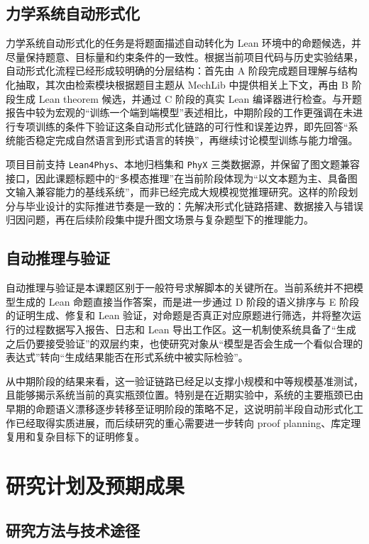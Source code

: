 \documentclass[12pt,a4paper]{ctexart}
\begin{document}
\subsection{力学系统自动形式化}

力学系统自动形式化的任务是将题面描述自动转化为 Lean 环境中的命题候选，并尽量保持题意、目标量和约束条件的一致性。根据当前项目代码与历史实验结果，自动形式化流程已经形成较明确的分层结构：首先由 A 阶段完成题目理解与结构化抽取，其次由检索模块根据题目主题从 MechLib 中提供相关上下文，再由 B 阶段生成 Lean theorem 候选，并通过 C 阶段的真实 Lean 编译器进行检查。与开题报告中较为宏观的“训练一个端到端模型”表述相比，中期阶段的工作更强调在未进行专项训练的条件下验证这条自动形式化链路的可行性和误差边界，即先回答“系统能否稳定完成自然语言到形式语言的转换”，再继续讨论模型训练与能力增强。

项目目前支持 \texttt{Lean4Phys}、本地归档集和 \texttt{PhyX} 三类数据源，并保留了图文题兼容接口，因此课题标题中的“多模态推理”在当前阶段体现为“以文本题为主、具备图文输入兼容能力的基线系统”，而非已经完成大规模视觉推理研究。这样的阶段划分与毕业设计的实际推进节奏是一致的：先解决形式化链路搭建、数据接入与错误归因问题，再在后续阶段集中提升图文场景与复杂题型下的推理能力。

\subsection{自动推理与验证}

自动推理与验证是本课题区别于一般符号求解脚本的关键所在。当前系统并不把模型生成的 Lean 命题直接当作答案，而是进一步通过 D 阶段的语义排序与 E 阶段的证明生成、修复和 Lean 验证，对命题是否真正对应原题进行筛选，并将整次运行的过程数据写入报告、日志和 Lean 导出工作区。这一机制使系统具备了“生成之后仍要接受验证”的双层约束，也使研究对象从“模型是否会生成一个看似合理的表达式”转向“生成结果能否在形式系统中被实际检验”。

从中期阶段的结果来看，这一验证链路已经足以支撑小规模和中等规模基准测试，且能够揭示系统当前的真实瓶颈位置。特别是在近期实验中，系统的主要瓶颈已由早期的命题语义漂移逐步转移至证明阶段的策略不足，这说明前半段自动形式化工作已经取得实质进展，而后续研究的重心需要进一步转向 proof planning、库定理复用和复杂目标下的证明修复。

\section{研究计划及预期成果}

\subsection{研究方法与技术途径}
\end{document}
